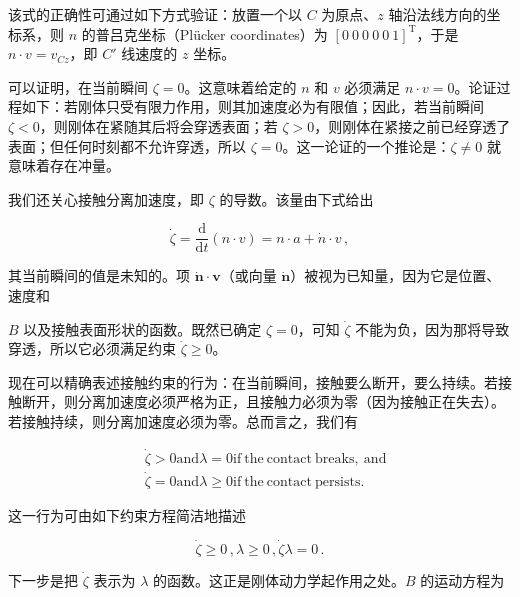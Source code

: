 \documentclass[10pt,a4paper]{book}
\theoremstyle{thmstyle} %
\theoremstyle{defstyle} %
\theoremstyle{prostyle} %
\begin{document}
该式的正确性可通过如下方式验证：放置一个以 $C$ 为原点、$z$ 轴沿法线方向的坐标系，则 $n$ 的普吕克坐标（Plücker coordinates）为 $[0\ 0\ 0\ 0\ 0\ 1]^{\mathrm{T}}$，于是 $n\cdot v=v_{Cz}$，即 $C'$ 线速度的 $z$ 坐标。



可以证明，在当前瞬间 $\zeta=0$。这意味着给定的 $n$ 和 $v$ 必须满足 $n\cdot v=0$。论证过程如下：若刚体只受有限力作用，则其加速度必为有限值；因此，若当前瞬间 $\zeta<0$，则刚体在紧随其后将会穿透表面；若 $\zeta>0$，则刚体在紧接之前已经穿透了表面；但任何时刻都不允许穿透，所以 $\zeta=0$。这一论证的一个推论是：$\zeta\neq0$ 就意味着存在冲量。



我们还关心接触分离加速度，即 $\zeta$ 的导数。该量由下式给出



$$
\dot { \zeta } = \frac { \mathrm { d } } { \mathrm { d } t } ( n \cdot v ) = n \cdot a + \dot { n } \cdot v \, ,
$$



其当前瞬间的值是未知的。项 $\dot{\boldsymbol{n}} \cdot \boldsymbol{v}$（或向量 $\dot{\boldsymbol{n}}$）被视为已知量，因为它是位置、速度和



$B$ 以及接触表面形状的函数。既然已确定 $\zeta=0$，可知 $\dot{\zeta}$ 不能为负，因为那将导致穿透，所以它必须满足约束 $\dot{\zeta}\geq0$。



现在可以精确表述接触约束的行为：在当前瞬间，接触要么断开，要么持续。若接触断开，则分离加速度必须严格为正，且接触力必须为零（因为接触正在失去）。若接触持续，则分离加速度必须为零。总而言之，我们有



$$
\begin{array}{rl} & { \dot { \zeta } > 0  \mathrm { a n d }  \lambda = 0  \mathrm { i f ~ t h e ~ c o n t a c t ~ b r e a k s , ~ a n d } } \\& { \dot { \zeta } = 0  \mathrm { a n d }  \lambda \geq 0  \mathrm { i f ~ t h e ~ c o n t a c t ~ p e r s i s t s . } } \end{array}
$$



这一行为可由如下约束方程简洁地描述



$$
\dot { \zeta } \geq 0 \, ,  \lambda \geq 0 \, ,  \dot { \zeta } \lambda = 0 \, .
$$



下一步是把 $\dot{\zeta}$ 表示为 $\lambda$ 的函数。这正是刚体动力学起作用之处。$B$ 的运动方程为
\end{document}
